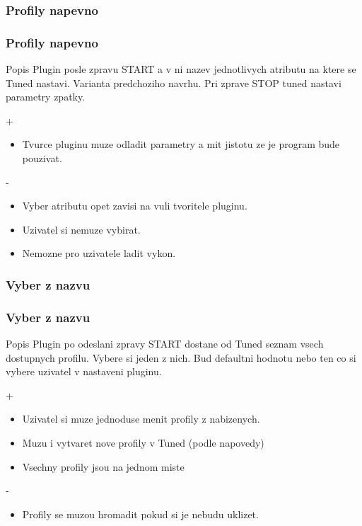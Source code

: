 \documentclass[pdf]{beamer}
\begin{document}
\subsubsection{Profily napevno}
\begin{frame} %
	\frametitle{Profily napevno}
	\begin{block}{Popis}
		Plugin posle zpravu START a v ni nazev jednotlivych atributu na ktere se Tuned nastavi.
		Varianta predchoziho navrhu.
		Pri zprave STOP tuned nastavi parametry zpatky.
	\end{block}
	\begin{block}{+}
		\begin{itemize}
			\item Tvurce pluginu muze odladit parametry a mit jistotu ze je program bude pouzivat. 
		\end{itemize}
	\end{block}
	\begin{block}{-}
		\begin{itemize}
			\item Vyber atributu opet zavisi na vuli tvoritele pluginu.
			\item Uzivatel si nemuze vybirat.
			\item Nemozne pro uzivatele ladit vykon.
		\end{itemize}
	\end{block}
\end{frame} %

\subsubsection{Vyber z nazvu}
\begin{frame} %
	\frametitle{Vyber z nazvu}
	\begin{block}{Popis}
		Plugin po odeslani zpravy START dostane od Tuned seznam vsech dostupnych profilu.
		Vybere si jeden z nich. Bud defaultni hodnotu nebo ten co si vybere uzivatel v nastaveni pluginu.
	\end{block}
	\begin{block}{+}
		\begin{itemize}
			\item Uzivatel si muze jednoduse menit profily z nabizenych.
			\item Muzu i vytvaret nove profily v Tuned (podle napovedy)
			\item Vsechny profily jsou na jednom miste
		\end{itemize}
	\end{block}
	\begin{block}{-}
		\begin{itemize}
			\item Profily se muzou hromadit pokud si je nebudu uklizet.
		\end{itemize}
	\end{block}
\end{frame} %
\end{document}
